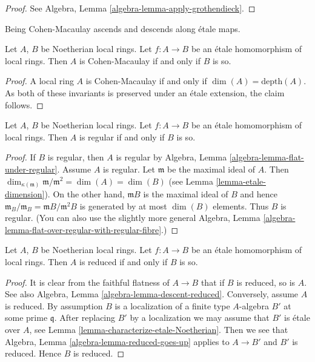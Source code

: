 \begin{proof}
See Algebra, Lemma \ref{algebra-lemma-apply-grothendieck}.
\end{proof}

\begin{proposition}
\label{proposition-etale-CM}
\begin{slogan}
Being Cohen-Macaulay ascends and descends along \'etale maps.
\end{slogan}
Let $A$, $B$ be Noetherian local rings.
Let $f : A \to B$ be an \'etale homomorphism of local rings.
Then $A$ is Cohen-Macaulay if and only if $B$ is so.
\end{proposition}

\begin{proof}
A local ring $A$ is Cohen-Macaulay if and only if $\dim(A) = \text{depth}(A)$.
As both of these invariants is preserved under an \'etale extension,
the claim follows.
\end{proof}

\begin{proposition}
\label{proposition-etale-regular}
Let $A$, $B$ be Noetherian local rings.
Let $f : A \to B$ be an \'etale homomorphism of local rings.
Then $A$ is regular if and only if $B$ is so.
\end{proposition}

\begin{proof}
If $B$ is regular, then $A$ is regular by
Algebra, Lemma \ref{algebra-lemma-flat-under-regular}.
Assume $A$ is regular. Let $\mathfrak m$ be the maximal ideal
of $A$. Then $\dim_{\kappa(\mathfrak m)} \mathfrak m/\mathfrak m^2 =
\dim(A) = \dim(B)$ (see Lemma \ref{lemma-etale-dimension}).
On the other hand, $\mathfrak mB$ is the maximal ideal of
$B$ and hence $\mathfrak m_B/\mathfrak m_B = \mathfrak mB/\mathfrak m^2B$
is generated by at most $\dim(B)$ elements. Thus $B$ is regular.
(You can also use the slightly more general
Algebra, Lemma \ref{algebra-lemma-flat-over-regular-with-regular-fibre}.)
\end{proof}


\begin{proposition}
\label{proposition-etale-reduced}
Let $A$, $B$ be Noetherian local rings.
Let $f : A \to B$ be an \'etale homomorphism of local rings.
Then $A$ is reduced if and only if $B$ is so.
\end{proposition}

\begin{proof}
It is clear from the faithful flatness of $A \to B$ that if $B$ is reduced, so
is $A$. See also Algebra, Lemma \ref{algebra-lemma-descent-reduced}.
Conversely, assume $A$ is reduced. By assumption $B$ is a localization
of a finite type $A$-algebra $B'$ at some prime $\mathfrak q$.
After replacing $B'$ by a localization we may assume that $B'$
is \'etale over $A$, see Lemma \ref{lemma-characterize-etale-Noetherian}.
Then we see that Algebra, Lemma \ref{algebra-lemma-reduced-goes-up} applies to
$A \to B'$ and $B'$ is reduced. Hence $B$ is reduced.
\end{proof}

